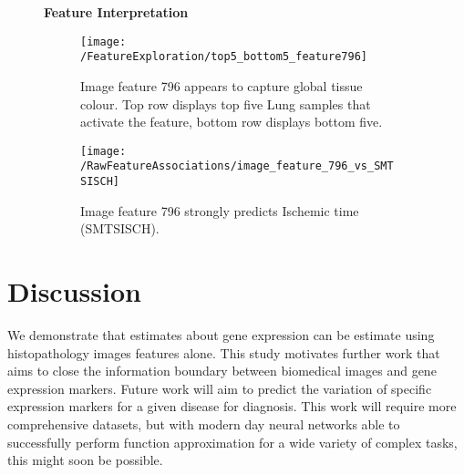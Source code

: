 \documentclass{article}
\newcommand*{\figuretitle}[1]{%
    {\centering%
    \textbf{#1}%
    \par\medskip}%
}
\begin{document}
\begin{figure}[h]
\figuretitle{Feature Interpretation}
\begin{subfigure}{0.6\textwidth}
    \centering
    \texttt{[image: /FeatureExploration/top5\_bottom5\_feature796]}
    \caption{Image feature 796 appears to capture global tissue colour. Top row displays top five Lung samples that activate the feature, bottom row displays bottom five.}
    \label{fig:top5_bottom5_feature796}
\end{subfigure}
\begin{subfigure}{0.3\textwidth}
    \centering
    \texttt{[image: /RawFeatureAssociations/image\_feature\_796\_vs\_SMTSISCH]}
    \caption{Image feature 796 strongly predicts Ischemic time (SMTSISCH).}
    \label{fig:image_feature_796_vs_SMTSISCH}
 \end{subfigure}
 \caption{}
\end{figure}

\section{Discussion}

We demonstrate that estimates about gene expression can be estimate using histopathology images features alone. This study motivates further work that aims to close the information boundary between biomedical images and gene expression markers. Future work will aim to predict the variation of specific expression markers for a given disease for diagnosis. This work will require more comprehensive datasets, but with modern day neural networks able to successfully perform function approximation for a wide variety of complex tasks, this might soon be possible.

\end{document}
